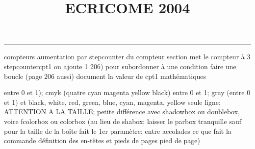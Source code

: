 \documentclass[11pt]{article}%
\title{\bf \vspace{-2cm} ECRICOME 2004} %
\author{} %
\date{} %
\renewcommand{\headrulewidth}{0pt}%
\renewcommand{\footrulewidth}{0.4pt}%
\begin{document}
\maketitle %
\vspace{-1.4cm}\hrule %
\thispagestyle{fancy}

\vspace*{.2cm}



compteurs%
aumentation par stepcounter du compteur section%
met le compteur à 3%
stepcounter{cpt1} on ajoute 1%
206) pour subordonner à une condition %
faire une boucle (page 206 aussi) %
document la valeur de cpt1 
mathématiques\newcommand{\ch}{\operatorname{ch}} 
\newcommand{\sh}{\operatorname{sh}}
\renewcommand{\tanh}{\operatorname{th}}
\renewcommand{\sinh}{\operatorname{sh}}
\renewcommand{\cosh}{\operatorname{ch}}
\newcommand{\argsh}{\operatorname{argsh}}
\newcommand{\argch}{\operatorname{argch}}
\newcommand{\argth}{\operatorname{argth}}
\newcommand{\Id}{\operatorname{Id}}
\renewcommand{\leq}{\leq}
\renewcommand{\geq}{\geq }

entre 0 et 1); cmyk (quatre cyan magenta yellow black) entre 0 et 1;
gray (entre 0 et 1) et black, white, red, green, blue, cyan, magenta,
yellow%
seule ligne; ATTENTION A LA TAILLE; petite différence avec shadowbox ou
doublebox, voire fcolorbox ou colorbox (au lieu de shabox; laisser le
parbox tranquille sauf pour la taille de la boîte
\newcommand{\Tbox}[1]{\begin{center} \shabox{\parbox{0.6
\linewidth}{#1}} \end{center}} %
fait le 1er paramètre; entre accolades ce que fait la commande
définition des en-têtes et pieds de pages\pagestyle{fancy}
\chead{}
\rfoot[ \ \thepage]{\thepage}
\cfoot{}
\lfoot{}
\thispagestyle{fancy} %
pied de page)\renewcommand{\footrulewidth}{0.4pt}
\renewcommand{\headrulewidth}{0.4pt}
\end{document}
